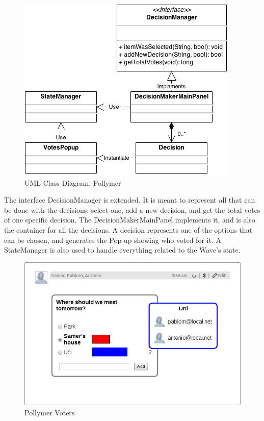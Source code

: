 \begin{figure}[H]
  \center
    \includegraphics[keepaspectratio, scale=0.5]{Media/Diagrams/Gadget/DecisionMaker.png}
  \caption{UML Class Diagram, Pollymer}
  \label{fig:decision_maker_diagram}
\end{figure}
The interface DecisionManager is extended. It is meant to represent all that can be done with the decisions: select one, add a new decision, and get the total votes of one specific decision. The DecisionMakerMainPanel implements it, and is also the container for all the decisions. A decision represents one of the options that can be chosen, and generates the Pop-up showing who voted for it. A StateManager is also used to handle everything related to the Wave's state.\\[.2cm]
\begin{figure}[H]
  \center
    \includegraphics[keepaspectratio, scale=0.35]{Media/Captures/Extensions/DecisionMakerGadget_votes.png}
  \caption{Pollymer Voters}
  \label{fig:decision_maker_votes}
\end{figure}
